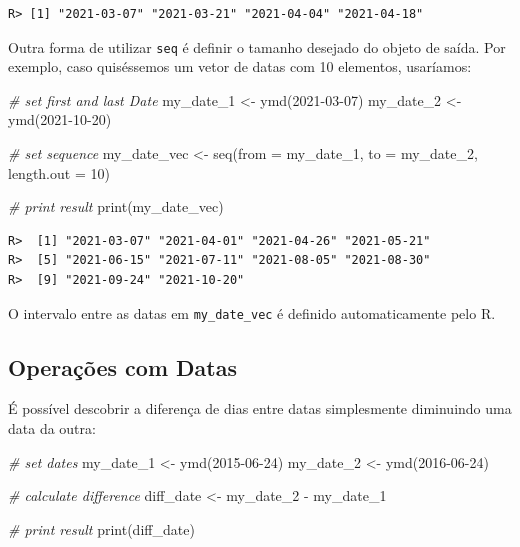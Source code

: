 \documentclass[
  11pt,
]{book}
\newenvironment{Shaded}{\begin{snugshade}}{\end{snugshade}}
\newcommand{\AttributeTok}[1]{\textcolor[rgb]{0.61,0.61,0.61}{#1}}
\newcommand{\CommentTok}[1]{\textcolor[rgb]{0.37,0.37,0.37}{\textit{#1}}}
\newcommand{\DecValTok}[1]{\textcolor[rgb]{0.06,0.06,0.06}{#1}}
\newcommand{\FunctionTok}[1]{\textcolor[rgb]{0,0,0}{#1}}
\newcommand{\NormalTok}[1]{#1}
\newcommand{\OtherTok}[1]{\textcolor[rgb]{0.37,0.37,0.37}{#1}}
\newcommand{\SpecialCharTok}[1]{\textcolor[rgb]{0,0,0}{#1}}
\newcommand{\StringTok}[1]{\textcolor[rgb]{0.5,0.5,0.5}{#1}}
\begin{document}
\begin{verbatim}
R> [1] "2021-03-07" "2021-03-21" "2021-04-04" "2021-04-18"
\end{verbatim}

Outra forma de utilizar \texttt{seq} é definir o tamanho desejado do objeto de saída. Por exemplo, caso quiséssemos um vetor de datas com 10 elementos, usaríamos:

\begin{Shaded}
\begin{Highlighting}[]
\CommentTok{\# set first and last Date}
\NormalTok{my\_date\_1 }\OtherTok{\textless{}{-}} \FunctionTok{ymd}\NormalTok{(}\StringTok{\textquotesingle{}2021{-}03{-}07\textquotesingle{}}\NormalTok{)}
\NormalTok{my\_date\_2 }\OtherTok{\textless{}{-}} \FunctionTok{ymd}\NormalTok{(}\StringTok{\textquotesingle{}2021{-}10{-}20\textquotesingle{}}\NormalTok{)}

\CommentTok{\# set sequence}
\NormalTok{my\_date\_vec }\OtherTok{\textless{}{-}} \FunctionTok{seq}\NormalTok{(}\AttributeTok{from =}\NormalTok{ my\_date\_1,}
                    \AttributeTok{to =}\NormalTok{ my\_date\_2,}
                    \AttributeTok{length.out =} \DecValTok{10}\NormalTok{)}

\CommentTok{\# print result}
\FunctionTok{print}\NormalTok{(my\_date\_vec)}
\end{Highlighting}
\end{Shaded}

\begin{verbatim}
R>  [1] "2021-03-07" "2021-04-01" "2021-04-26" "2021-05-21"
R>  [5] "2021-06-15" "2021-07-11" "2021-08-05" "2021-08-30"
R>  [9] "2021-09-24" "2021-10-20"
\end{verbatim}

O intervalo entre as datas em \texttt{my\_date\_vec} é definido automaticamente pelo R.

\hypertarget{operauxe7uxf5es-com-datas}{%
\subsection{Operações com Datas}\label{operauxe7uxf5es-com-datas}}

É possível descobrir a diferença de dias entre datas simplesmente diminuindo uma data da outra:

\begin{Shaded}
\begin{Highlighting}[]
\CommentTok{\# set dates}
\NormalTok{my\_date\_1 }\OtherTok{\textless{}{-}} \FunctionTok{ymd}\NormalTok{(}\StringTok{\textquotesingle{}2015{-}06{-}24\textquotesingle{}}\NormalTok{)}
\NormalTok{my\_date\_2 }\OtherTok{\textless{}{-}} \FunctionTok{ymd}\NormalTok{(}\StringTok{\textquotesingle{}2016{-}06{-}24\textquotesingle{}}\NormalTok{)}

\CommentTok{\# calculate difference}
\NormalTok{diff\_date }\OtherTok{\textless{}{-}}\NormalTok{ my\_date\_2 }\SpecialCharTok{{-}}\NormalTok{ my\_date\_1}

\CommentTok{\# print result}
\FunctionTok{print}\NormalTok{(diff\_date)}
\end{Highlighting}
\end{Shaded}
\end{document}
